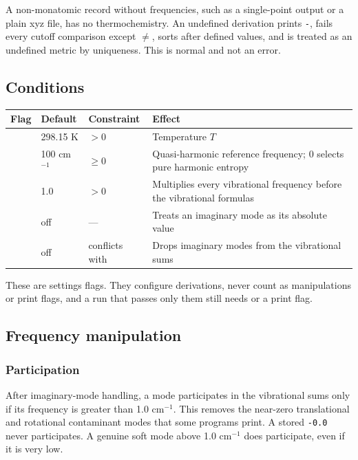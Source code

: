A non-monatomic record without frequencies, such as a single-point output or
a plain xyz file, has no thermochemistry. An undefined derivation prints
\texttt{-}, fails every cutoff comparison except $\ne$, sorts after defined
values, and is treated as an undefined metric by uniqueness. This is normal
and not an error.

\subsection{Conditions}\label{sec:thermo-conditions}

\begin{center}
\begin{tabularx}{\textwidth}{@{}L{2.7cm}L{2.0cm}L{2.7cm}X@{}}
\toprule
\textbf{Flag} & \textbf{Default} & \textbf{Constraint} & \textbf{Effect} \\
\midrule
{} & 298.15 K & $>0$ & Temperature $T$ \\
 & 100 cm$^{-1}$ & $\ge 0$ & Quasi-harmonic reference frequency;
0 selects pure harmonic entropy \\
 & 1.0 & $>0$ & Multiplies every vibrational frequency before
the vibrational formulas \\
 & off & --- & Treats an imaginary mode as its absolute
value \\
 & off & conflicts with  & Drops imaginary
modes from the vibrational sums \\
\bottomrule
\end{tabularx}
\end{center}

These are settings flags. They configure derivations, never count as
manipulations or print flags, and a run that passes only them still needs
 or a print flag.

\subsection{Frequency manipulation}\label{sec:freq-manipulation}

\subsubsection*{Participation}

After imaginary-mode handling, a mode participates in the vibrational sums
only if its frequency is greater than 1.0 cm$^{-1}$. This removes the
near-zero translational and rotational contaminant modes that some programs
print. A stored \texttt{-0.0} never participates. A genuine soft mode above
1.0 cm$^{-1}$ does participate, even if it is very low.

